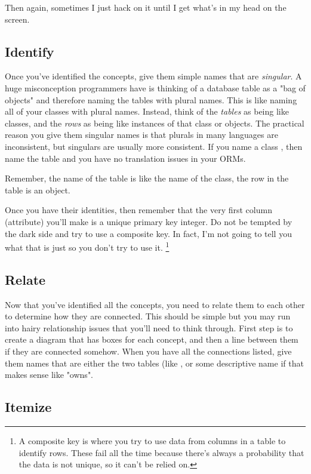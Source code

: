 Then again, sometimes I just hack on it until I get what's in my head on the screen.

\subsection{Identify}

Once you've identified the concepts, give them simple names that are \emph{singular}.  A huge 
misconception programmers have is thinking of a database table as a "bag of objects" and therefore
naming the tables with plural names.  This is like naming all of your classes with plural names.
Instead, think of the \emph{tables} as being like classes, and the \emph{rows} as being like
instances of that class or objects.  The practical reason you give them singular names is that
plurals in many languages are inconsistent, but singulars are usually more consistent.  If you
name a class , then name the table  and you have no translation
issues in your ORMs.

Remember, the name of the table is like the name of the class, the row in the table is an
object.

Once you have their identities, then remember that the very first column
(attribute) you'll make is a unique primary key integer.  Do not be tempted by
the dark side and try to use a composite key.  In fact, I'm not going to tell
you what that is just so you don't try to use it.  \footnote{A composite key is
    where you try to use data from columns in a table to identify rows.  These
        fail all the time because there's always a probability that the data is
        not unique, so it can't be relied on.}

\subsection{Relate}

Now that you've identified all the concepts, you need to relate them to each
other to determine how they are connected.  This should be simple but you may
run into hairy relationship issues that you'll need to think through.  First
step is to create a diagram that has boxes for each concept, and then a line
between them if they are connected somehow.  When you have all the connections
listed, give them names that are either the two tables (like
, or some descriptive name if that makes sense like
"owns".

\subsection{Itemize}

